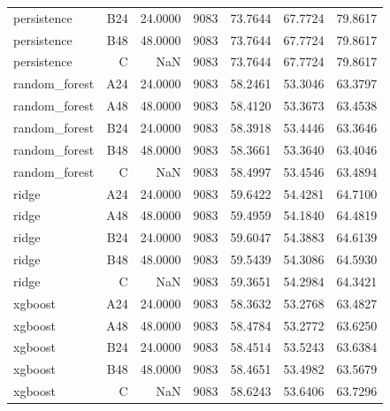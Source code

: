 \begin{table}[htbp]
\begin{tabular}{lrrrrrr}
persistence & B24 & 24.0000 & 9083 & 73.7644 & 67.7724 & 79.8617 \\
persistence & B48 & 48.0000 & 9083 & 73.7644 & 67.7724 & 79.8617 \\
persistence & C & NaN & 9083 & 73.7644 & 67.7724 & 79.8617 \\
random\_forest & A24 & 24.0000 & 9083 & 58.2461 & 53.3046 & 63.3797 \\
random\_forest & A48 & 48.0000 & 9083 & 58.4120 & 53.3673 & 63.4538 \\
random\_forest & B24 & 24.0000 & 9083 & 58.3918 & 53.4446 & 63.3646 \\
random\_forest & B48 & 48.0000 & 9083 & 58.3661 & 53.3640 & 63.4046 \\
random\_forest & C & NaN & 9083 & 58.4997 & 53.4546 & 63.4894 \\
ridge & A24 & 24.0000 & 9083 & 59.6422 & 54.4281 & 64.7100 \\
ridge & A48 & 48.0000 & 9083 & 59.4959 & 54.1840 & 64.4819 \\
ridge & B24 & 24.0000 & 9083 & 59.6047 & 54.3883 & 64.6139 \\
ridge & B48 & 48.0000 & 9083 & 59.5439 & 54.3086 & 64.5930 \\
ridge & C & NaN & 9083 & 59.3651 & 54.2984 & 64.3421 \\
xgboost & A24 & 24.0000 & 9083 & 58.3632 & 53.2768 & 63.4827 \\
xgboost & A48 & 48.0000 & 9083 & 58.4784 & 53.2772 & 63.6250 \\
xgboost & B24 & 24.0000 & 9083 & 58.4514 & 53.5243 & 63.6384 \\
xgboost & B48 & 48.0000 & 9083 & 58.4651 & 53.4982 & 63.5679 \\
xgboost & C & NaN & 9083 & 58.6243 & 53.6406 & 63.7296 \\
\bottomrule
\end{tabular}
\end{table}
